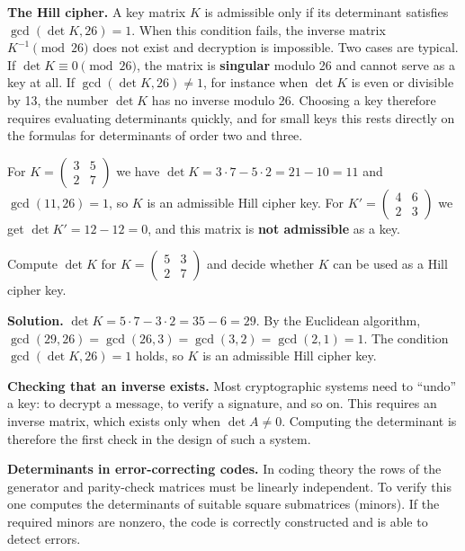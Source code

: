 \textbf{The Hill cipher.} A key matrix $K$ is admissible only if its determinant
satisfies $\gcd(\det K, 26) = 1$. When this condition fails, the inverse matrix
$K^{-1} \pmod{26}$ does not exist and decryption is impossible. Two cases are
typical. If $\det K \equiv 0 \pmod{26}$, the matrix is \textbf{singular} modulo 26 and
cannot serve as a key at all. If $\gcd(\det K, 26) \neq 1$, for instance when
$\det K$ is even or divisible by 13, the number $\det K$ has no inverse modulo 26.
Choosing a key therefore requires evaluating determinants quickly, and for small
keys this rests directly on the formulas for determinants of order two and three.
\vspace{3pt}
\begin{misol}
For $K=\begin{pmatrix}3 & 5\\ 2 & 7\end{pmatrix}$ we have
$\det K = 3\cdot 7 - 5\cdot 2 = 21-10=11$ and $\gcd(11,26)=1$, so $K$ is an admissible
Hill cipher key. For $K'=\begin{pmatrix}4 & 6\\ 2 & 3\end{pmatrix}$ we get
$\det K' = 12-12=0$, and this matrix is \textbf{not admissible} as a key.
\end{misol}
\begin{misol}
Compute $\det K$ for $K=\begin{pmatrix}5 & 3\\ 2 & 7\end{pmatrix}$ and decide whether
$K$ can be used as a Hill cipher key.

\textbf{Solution.} $\det K = 5\cdot 7 - 3\cdot 2 = 35 - 6 = 29$.
By the Euclidean algorithm, $\gcd(29, 26) = \gcd(26, 3) = \gcd(3, 2) = \gcd(2, 1) = 1$.
The condition $\gcd(\det K, 26) = 1$ holds, so $K$ is an admissible Hill cipher key.
\end{misol}
\textbf{Checking that an inverse exists.}
Most cryptographic systems need to “undo” a key: to decrypt a message, to verify a
signature, and so on. This requires an inverse matrix, which exists only when
$\det A \neq 0$. Computing the determinant is therefore the first check in the
design of such a system.

\textbf{Determinants in error-correcting codes.}
In coding theory the rows of the generator and parity-check matrices must be
linearly independent. To verify this one computes the determinants of suitable
square submatrices (minors). If the required minors are nonzero, the code is
correctly constructed and is able to detect errors.

